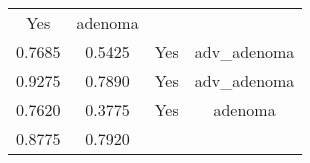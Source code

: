 \documentclass[12pt,]{article}
\begin{document}
\begin{longtable}[]{@{}cccc@{}}
\begin{minipage}[t]{0.22\columnwidth}
Yes\strut
\end{minipage} & \begin{minipage}[t]{0.16\columnwidth}\centering\strut
adenoma\strut
\end{minipage}\tabularnewline
\begin{minipage}[t]{0.24\columnwidth}\centering\strut
0.7685\strut
\end{minipage} & \begin{minipage}[t]{0.26\columnwidth}\centering\strut
0.5425\strut
\end{minipage} & \begin{minipage}[t]{0.22\columnwidth}\centering\strut
Yes\strut
\end{minipage} & \begin{minipage}[t]{0.16\columnwidth}\centering\strut
adv\_adenoma\strut
\end{minipage}\tabularnewline
\begin{minipage}[t]{0.24\columnwidth}\centering\strut
0.9275\strut
\end{minipage} & \begin{minipage}[t]{0.26\columnwidth}\centering\strut
0.7890\strut
\end{minipage} & \begin{minipage}[t]{0.22\columnwidth}\centering\strut
Yes\strut
\end{minipage} & \begin{minipage}[t]{0.16\columnwidth}\centering\strut
adv\_adenoma\strut
\end{minipage}\tabularnewline
\begin{minipage}[t]{0.24\columnwidth}\centering\strut
0.7620\strut
\end{minipage} & \begin{minipage}[t]{0.26\columnwidth}\centering\strut
0.3775\strut
\end{minipage} & \begin{minipage}[t]{0.22\columnwidth}\centering\strut
Yes\strut
\end{minipage} & \begin{minipage}[t]{0.16\columnwidth}\centering\strut
adenoma\strut
\end{minipage}\tabularnewline
\begin{minipage}[t]{0.24\columnwidth}\centering\strut
0.8775\strut
\end{minipage} & \begin{minipage}[t]{0.26\columnwidth}\centering\strut
0.7920\strut
\end{minipage} & \begin{minipage}[t]{0.22\columnwidth}\centering\strut

\end{minipage}
\end{longtable}
\end{document}

